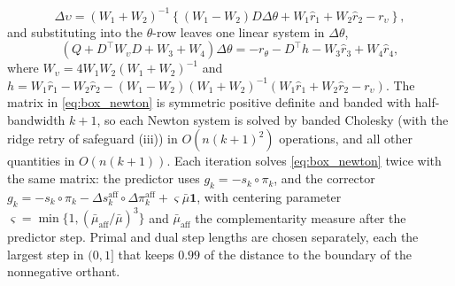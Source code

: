 \[
\Delta\upsilon = (W_1 + W_2)^{-1}\left\{(W_1 - W_2)D\Delta\theta + W_1\hat r_1 + W_2\hat r_2 - r_\upsilon\right\},
\]
and substituting into the $\theta$-row leaves one linear system in $\Delta\theta$,
\begin{equation}
\left(Q + D^\top W_\upsilon D + W_3 + W_4\right)\Delta\theta = -r_\theta - D^\top h - W_3\hat r_3 + W_4\hat r_4,
\label{eq:box_newton}
\end{equation}
where $W_\upsilon = 4W_1W_2(W_1 + W_2)^{-1}$ and $h = W_1\hat r_1 - W_2\hat r_2 - (W_1 - W_2)(W_1 + W_2)^{-1}(W_1\hat r_1 + W_2\hat r_2 - r_\upsilon)$. The matrix in \eqref{eq:box_newton} is symmetric positive definite and banded with half-bandwidth $k+1$, so each Newton system is solved by banded Cholesky (with the ridge retry of safeguard (iii)) in $O(n(k+1)^2)$ operations, and all other quantities in $O(n(k+1))$. Each iteration solves \eqref{eq:box_newton} twice with the same matrix: the predictor uses $g_k = -s_k\circ\pi_k$, and the corrector $g_k = -s_k\circ\pi_k - \Delta s_k^{\mathrm{aff}}\circ\Delta\pi_k^{\mathrm{aff}} + \varsigma\bar\mu\mathbf 1$, with centering parameter $\varsigma = \min\{1, (\bar\mu_{\mathrm{aff}}/\bar\mu)^3\}$ and $\bar\mu_{\mathrm{aff}}$ the complementarity measure after the predictor step. Primal and dual step lengths are chosen separately, each the largest step in $(0, 1]$ that keeps $0.99$ of the distance to the boundary of the nonnegative orthant.

